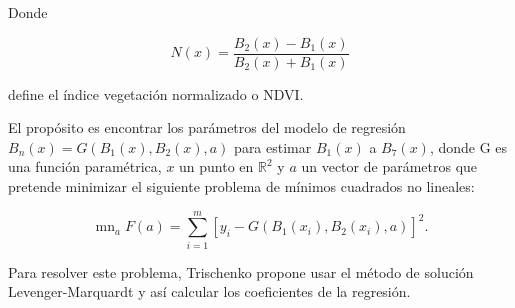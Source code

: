 Donde 

\begin{equation}
N(x) =  \frac{B_{2}(x)-B_{1}(x)}{B_{2}(x) + B_{1}(x)}
\end{equation}

define el índice vegetación normalizado o NDVI.

El propósito es encontrar los parámetros del modelo de regresión $B_{n}(x) = G(B_{1}(x), B_{2}(x), a)$ para estimar $B_{1}(x)$ a $B_{7}(x)$, donde G es una función paramétrica, $x$ un punto en $\mathbb{R}^{2}$ y $a$ un vector de parámetros que pretende minimizar el siguiente problema de mínimos cuadrados no lineales: 

\begin{equation}
\mathop{m\acute{i}n}_{a} F(a) = \sum_{i=1}^{m} [y_{i} - G(B_{1}(x_{i}), B_{2}(x_{i}),a)]^{2}.
\end{equation}

Para resolver este problema, Trischenko propone usar el método de solución Levenger-Marquardt y así calcular los coeficientes de la regresión. 


